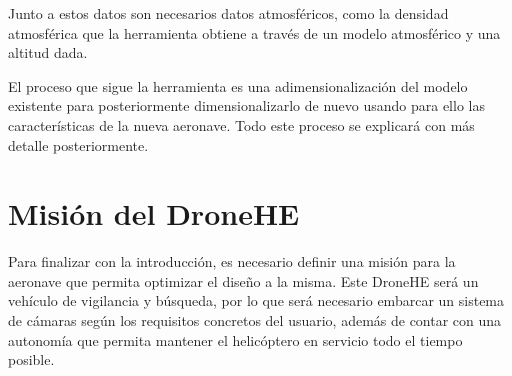 Junto a estos datos son necesarios datos atmosféricos, como la densidad atmosférica que la herramienta obtiene a través de un modelo atmosférico y una altitud dada.

El proceso que sigue la herramienta es una adimensionalización del modelo existente para posteriormente dimensionalizarlo de nuevo usando para ello las características de la nueva aeronave. Todo este proceso se explicará con más detalle posteriormente.

\section{Misión del DroneHE}

Para finalizar con la introducción, es necesario definir una misión para la aeronave que permita optimizar el diseño a la misma.
Este DroneHE será un vehículo de vigilancia y búsqueda, por lo que será necesario embarcar un sistema de cámaras según los requisitos concretos del usuario, además de contar con una autonomía que permita mantener el helicóptero en servicio todo el tiempo posible.

